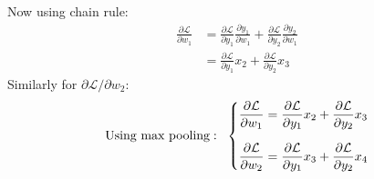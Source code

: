 \documentclass[12]{article}
\newcommand{\myskip}{0.7em}
\begin{document}
\begin{enumerate}[label=\textbf{(\alph*)}]
\[		\]
		Now using chain rule:
		\[
		\begin{aligned}
			\frac{\partial \mathcal{L}}{\partial w_1} &= \frac{\partial \mathcal{L}}{\partial y_1}\frac{\partial y_1}{\partial w_1} + \frac{\partial \mathcal{L}}{\partial y_2} \frac{\partial y_2}{\partial w_1} \\[\myskip]
			&= \frac{\partial \mathcal{L}}{\partial y_1}x_2 + \frac{\partial \mathcal{L}}{\partial y_2}x_3
		\end{aligned}
		\]
		Similarly for $\partial \mathcal{L}/\partial w_2$:
		\[
		\text{Using max pooling}:\;\; \begin{dcases}
			\frac{\partial \mathcal{L}}{\partial w_1} = \frac{\partial \mathcal{L}}{\partial y_1}x_2 + \frac{\partial \mathcal{L}}{\partial y_2}x_3 \\[\myskip]
			\frac{\partial \mathcal{L}}{\partial w_2} = \frac{\partial \mathcal{L}}{\partial y_1}x_3 + \frac{\partial \mathcal{L}}{\partial y_2}x_4
		\end{dcases}
		\]
	\end{enumerate}
\end{document}
